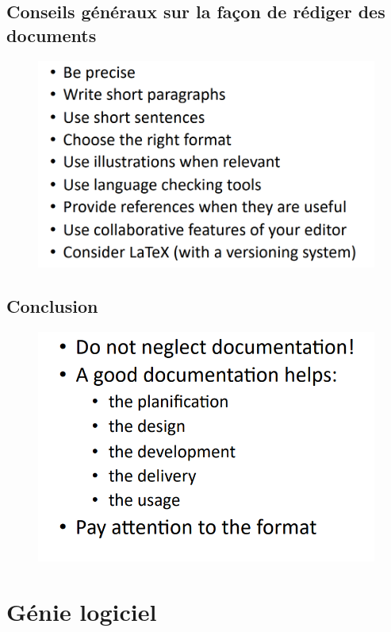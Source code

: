 \documentclass[12pt]{article}
\begin{document}
\subsection{Conseils généraux sur la façon de rédiger des documents}
	\begin{figure}[!hbtp]
	\centering
	\includegraphics[scale=0.75]{Capture8.PNG}
\end{figure}
\subsection{Conclusion}
\begin{figure}[!hbtp]
	\centering
	\includegraphics[scale=0.75]{Capture9.PNG}
\end{figure}
\section{Génie logiciel}
\end{document}
